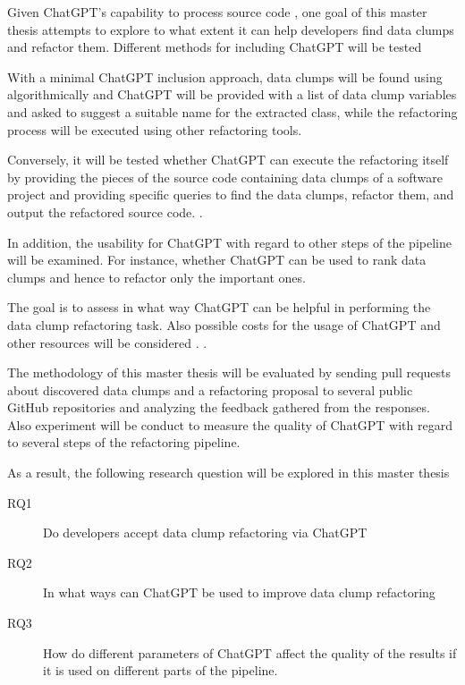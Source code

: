 Given ChatGPT's capability to process  source code \cite{sadik2023analysis}\cite{guo2023exploring}, one goal of this master thesis attempts to explore to what extent it can help developers find data clumps and refactor them. Different methods for including ChatGPT will be tested  

With a minimal ChatGPT inclusion approach,  data clumps will be found using algorithmically  and ChatGPT will be provided with a list of data clump variables and asked to suggest a suitable name for the extracted class, while the refactoring process will be executed using other refactoring tools.


Conversely, it will be tested whether ChatGPT can execute the refactoring itself by providing the pieces of the source code containing data clumps of a software project and providing specific queries to find the data clumps, refactor them, and output the refactored source code. \cite{White2023ChatGPTPP}.

In addition, the usability for ChatGPT with regard to other steps of the pipeline will be examined. For instance, whether ChatGPT can be used to rank data clumps and hence to refactor only the important ones. 

The goal is to assess in what way ChatGPT can be helpful in performing the data clump refactoring task. Also possible costs for the usage of ChatGPT and other resources will be considered \cite{xia2023conversation}. \cite{4ef0b456377aafb68884e643779dffb36b8e7cc1}.


The methodology of this master thesis will be evaluated by sending  pull requests about discovered data clumps and a refactoring proposal to several public GitHub repositories and analyzing the feedback gathered from the responses. Also experiment will be conduct to measure the quality of ChatGPT with regard to several steps of the refactoring pipeline.  

As a result, the following research question will be explored in this master thesis

\begin{description}
    \item [RQ1] Do developers accept data clump refactoring via ChatGPT
    \item [RQ2] In what ways can ChatGPT be used to improve data clump refactoring
    \item [RQ3] How do different parameters of ChatGPT affect the quality of the results if it is used on different parts of the pipeline. 
\end{description}

